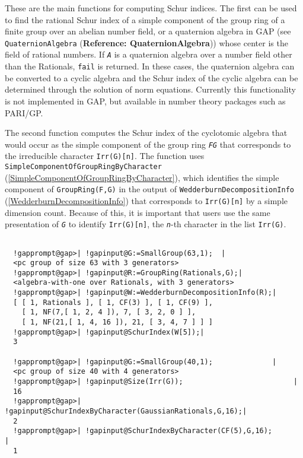 \documentclass[a4paper,11pt]{report}
\begin{document}
{{{ These are the main functions for computing Schur indices. The first can be
used to find the rational Schur index of a simple component of the group ring
of a finite group over an abelian number field, or a quaternion algebra in \textsf{GAP} (see \texttt{QuaternionAlgebra} (\textbf{Reference: QuaternionAlgebra})) whose center is the field of rational numbers. If \mbox{\texttt{\mdseries\slshape A}} is a quaternion algebra over a number field other than the Rationals, \texttt{fail} is returned. In these cases, the quaternion algebra can be converted to a
cyclic algebra and the Schur index of the cyclic algebra can be determined
through the solution of norm equations. Currently this functionality is not
implemented in \textsf{GAP}, but available in number theory packages such as \textsf{PARI/GP}. 

 The second function computes the Schur index of the cyclotomic algebra that
would occur as the simple component of the group ring \mbox{\texttt{\mdseries\slshape FG}} that corresponds to the irreducible character \texttt{Irr(G)[n]}. The function uses \texttt{SimpleComponentOfGroupRingByCharacter} (\ref{SimpleComponentOfGroupRingByCharacter}), which identifies the simple component of \texttt{GroupRing(F,G)} in the output of \texttt{WedderburnDecompositionInfo} (\ref{WedderburnDecompositionInfo}) that corresponds to \texttt{Irr(G)[n]} by a simple dimension count. Because of this, it is important that users use
the same presentation of \mbox{\texttt{\mdseries\slshape G}} to identify \texttt{Irr(G)[n]}, the \mbox{\texttt{\mdseries\slshape n}}-th character in the list \texttt{Irr(G)}. 
\begin{Verbatim}[commandchars=!@|,fontsize=\small,frame=single,label=Example]
  
  !gapprompt@gap>| !gapinput@G:=SmallGroup(63,1);  |
  <pc group of size 63 with 3 generators>
  !gapprompt@gap>| !gapinput@R:=GroupRing(Rationals,G);|
  <algebra-with-one over Rationals, with 3 generators>
  !gapprompt@gap>| !gapinput@W:=WedderburnDecompositionInfo(R);|
  [ [ 1, Rationals ], [ 1, CF(3) ], [ 1, CF(9) ], 
    [ 1, NF(7,[ 1, 2, 4 ]), 7, [ 3, 2, 0 ] ], 
    [ 1, NF(21,[ 1, 4, 16 ]), 21, [ 3, 4, 7 ] ] ]
  !gapprompt@gap>| !gapinput@SchurIndex(W[5]);|
  3
  
  !gapprompt@gap>| !gapinput@G:=SmallGroup(40,1);              |
  <pc group of size 40 with 4 generators>
  !gapprompt@gap>| !gapinput@Size(Irr(G));                          |
  16
  !gapprompt@gap>| !gapinput@SchurIndexByCharacter(GaussianRationals,G,16);|
  2
  !gapprompt@gap>| !gapinput@SchurIndexByCharacter(CF(5),G,16);         |
  1
  

\end{Verbatim}}}}
\end{document}
